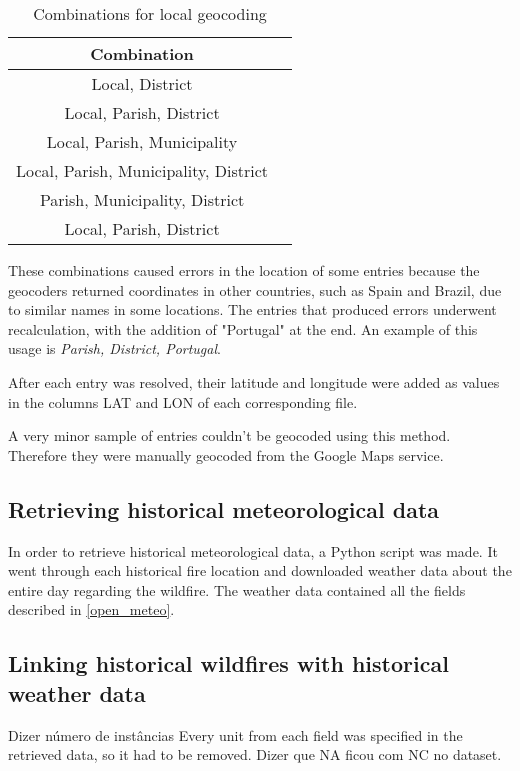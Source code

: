 \begin{table}[h!]
	\caption{Combinations for local geocoding}
	\label{geocoding_entries_2001_2012}
	\centering
	\small
	\begin{tabular}{cp{7.5cm}|} %
		\hline
		\textbf{Combination}\\
		\hline
		Local, District\\
		\hline
		Local, Parish, District\\
		\hline
		Local, Parish, Municipality\\
		\hline
		Local, Parish, Municipality, District\\
		\hline
		Parish, Municipality, District\\
		\hline
		Local, Parish, District\\
		\hline
	\end{tabular}
\end{table}


These combinations caused errors in the location of some entries because the geocoders returned coordinates in other countries, such as Spain and Brazil, due to similar names in some locations. The entries that produced errors underwent recalculation, with the addition of "Portugal" at the end. An example of this usage is  {\it Parish, District, Portugal}.

After each entry was resolved, their latitude and longitude were added as values in the columns LAT and LON of each corresponding file.


A very minor sample of entries couldn't be geocoded using this method. Therefore they were manually geocoded from the Google Maps service. 



\subsection{Retrieving historical meteorological data}
In order to retrieve historical meteorological data, a Python script was made. It went through each historical fire location and downloaded weather data about the entire day regarding the wildfire. The weather data contained all the fields described in \ref{open_meteo}. 



\subsection{Linking historical wildfires with historical weather data}
Dizer número de instâncias
Every unit from each field was specified in the retrieved data, so it had to be removed.
Dizer que NA ficou com NC no dataset.




